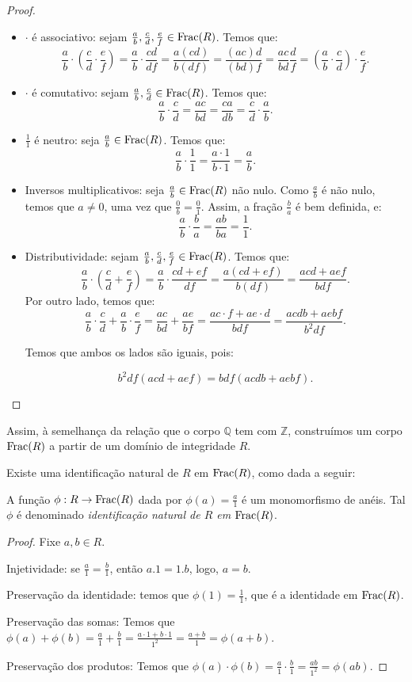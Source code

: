 \begin{proof}
    \begin{itemize}
        \item $\cdot $ é associativo: sejam $\frac{a}{b}, \frac{c}{d}, \frac{e}{f} \in \operatorname{Frac}(R)$. Temos que:
        \[\frac{a}{b}\cdot\left(\frac{c}{d}\cdot\frac{e}{f}\right)=\frac{a}{b}\cdot\frac{cd}{df}=\frac{a(cd)}{b(df)}=\frac{(ac)d}{(bd)f}=\frac{ac}{bd}\frac{d}{f}=\left(\frac{a}{b}\cdot\frac{c}{d}\right)\cdot \frac{e}{f}.\]
        \item $\cdot $ é comutativo: sejam $\frac{a}{b}, \frac{c}{d} \in \operatorname{Frac}(R)$. Temos que:
        \[\frac{a}{b}\cdot\frac{c}{d}=\frac{ac}{bd}=\frac{ca}{db}=\frac{c}{d}\cdot\frac{a}{b}.\]
        \item $\frac{1}{1}$ é neutro: seja $\frac{a}{b} \in \operatorname{Frac}(R)$. Temos que:
        \[\frac{a}{b}\cdot\frac{1}{1}=\frac{a\cdot 1}{b\cdot 1}=\frac{a}{b}.\]
        \item Inversos multiplicativos: seja $\frac{a}{b} \in \operatorname{Frac}(R)$ não nulo.
        Como $\frac{a}{b}$ é não nulo, temos que $a\neq 0$, uma vez que $\frac{0}{b}=\frac{0}{1}$.
        Assim, a fração $\frac{b}{a}$ é bem definida, e:
        \[\frac{a}{b}\cdot\frac{b}{a}=\frac{ab}{ba}=\frac{1}{1}.\]
        \item Distributividade: sejam $\frac{a}{b}, \frac{c}{d}, \frac{e}{f} \in \operatorname{Frac}(R)$. Temos que:
        \[\frac{a}{b}\cdot\left(\frac{c}{d}+\frac{e}{f}\right)=\frac{a}{b}\cdot\frac{cd+ef}{df}=\frac{a(cd+ef)}{b(df)}=\frac{acd+aef}{bdf}.\]
        Por outro lado, temos que:
        \[\frac{a}{b}\cdot\frac{c}{d}+\frac{a}{b}\cdot\frac{e}{f}=\frac{ac}{bd}+\frac{ae}{bf}=\frac{ac\cdot f+ae\cdot d}{bdf}=\frac{acdb+aebf}{b^2df}.\]

        Temos que ambos os lados são iguais, pois:

        \[b^2df(acd+aef)=bdf(acdb+aebf).\]
    \end{itemize}
\end{proof}

Assim, à semelhança da relação que o corpo $\mathbb Q$ tem com $\mathbb Z$, construímos um corpo $\operatorname{Frac}(R)$ a partir de um domínio de integridade $R$.

Existe uma identificação natural de $R$ em $\operatorname{Frac}(R)$, como dada a seguir:

\begin{prop}
    A função $\phi:R\rightarrow \operatorname{Frac}(R)$ dada por $\phi(a)=\frac{a}{1}$ é um monomorfismo de anéis. Tal $\phi$ é denominado \emph{identificação natural de $R$ em $\operatorname{Frac}(R)$}.
\end{prop}
\begin{proof}
    Fixe $a, b \in R$.

    Injetividade: se $\frac{a}{1}=\frac{b}{1}$, então $a.1=1.b$, logo, $a=b$.

    Preservação da identidade: temos que $\phi(1)=\frac{1}{1}$, que é a identidade em $\operatorname{Frac}(R)$.

    Preservação das somas: Temos que $\phi(a)+\phi(b)=\frac{a}{1}+\frac{b}{1}=\frac{a\cdot 1+b\cdot 1}{1^2}=\frac{a+b}{1}=\phi(a+b)$.

    Preservação dos produtos: Temos que $\phi(a)\cdot\phi(b)=\frac{a}{1}\cdot\frac{b}{1}=\frac{ab}{1^2}=\phi(ab)$.
\end{proof}

